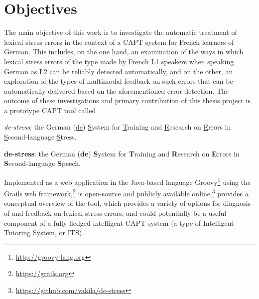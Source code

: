 \section{Objectives}
\label{sec:intro:objectives}


The main objective of this work is to investigate the automatic treatment of lexical stress errors in the context of a CAPT system for French learners of German. This includes, on the one hand, an examination of the ways in which lexical stress errors of the type made by French L1 speakers when speaking German as L2 can be reliably detected %
automatically, and on the other, an exploration of the types of multimodal feedback on such errors that can be automatically delivered based on the aforementioned error detection. 
%
%
%
The outcome of these investigations and primary contribution of this thesis project is a prototype CAPT tool called 

\textit{de-stress}: the German (\underline{de}) \underline{S}ystem for \underline{T}raining and \underline{R}esearch on \underline{E}rrors in \underline{S}econd-language \underline{S}tress. 

\textbf{de-stress}: the German (\textbf{de}) \textbf{S}ystem for \textbf{T}raining and \textbf{R}esearch on \textbf{E}rrors in \textbf{S}econd-language \textbf{S}peech.

Implemented as a web application in the Java-based language Groovy\footnote{\url{http://groovy-lang.org}} using the Grails web framework,\footnote{\url{https://grails.org}}  is open-source and publicly available online.\footnote{\url{https://github.com/vakila/de-stress}}
 provides a conceptual overview of the tool, which provides a variety of options for diagnosis of and feedback on lexical stress errors, and could potentially be a useful component of a fully-fledged intelligent CAPT system (a type of Intelligent Tutoring System, or ITS). 

